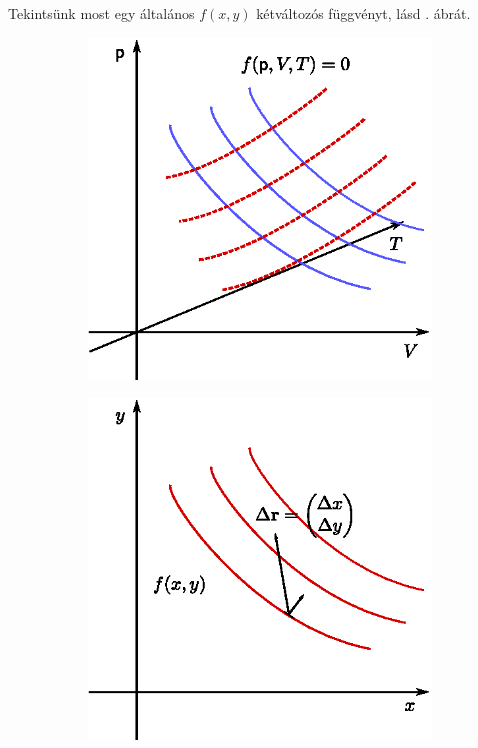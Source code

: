 Tekintsünk most egy általános $f(x,y)$ kétváltozós függvényt, lásd . ábrát.
\begin{figure}[!h]
    \centering
    \begin{subfigure}[]{0.45\textwidth}
            \centering
            \includegraphics[width=\textwidth]{termo_2/termo_2_5}
            \label{fig:termo_2_5}
    \end{subfigure}\hfill
    \begin{subfigure}[]{0.45\textwidth}
            \centering
            \includegraphics[width=\textwidth]{termo_2/termo_2_6}
            \label{fig:termo_2_6}
    \end{subfigure}
\end{figure}
